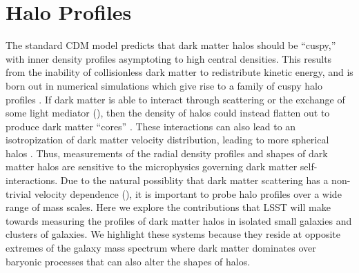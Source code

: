 \section{Halo Profiles} 
\label{sec:profiles}

The standard CDM model predicts that dark matter halos should be ``cuspy,'' \ie with inner density profiles asymptoting to high central densities.
This results from the inability of collisionless dark matter to redistribute kinetic energy, and is born out in numerical simulations which give rise to a family of cuspy halo profiles \citep[\eg, the NFW profile;][]{Navarro:1996gj}.
If dark matter is able to interact through scattering or the exchange of some light mediator (), then the density of halos could instead flatten out to produce dark matter ``cores'' \citep{Spergel:1999mh}.
These interactions can also lead to an isotropization of dark matter velocity distribution, leading to more spherical halos \citep{Peter:2013}.
Thus, measurements of the radial density profiles and shapes of dark matter halos are sensitive to the microphysics governing dark matter self-interactions.
Due to the natural possiblity that dark matter scattering has a non-trivial velocity dependence (), it is important to probe halo profiles over a wide range of mass scales.
Here we explore the contributions that LSST will make towards measuring the profiles of dark matter halos in isolated small galaxies and clusters of galaxies.
We highlight these systems because they reside at opposite extremes of the galaxy mass spectrum where dark matter dominates over baryonic processes that can also alter the shapes of halos.



 
